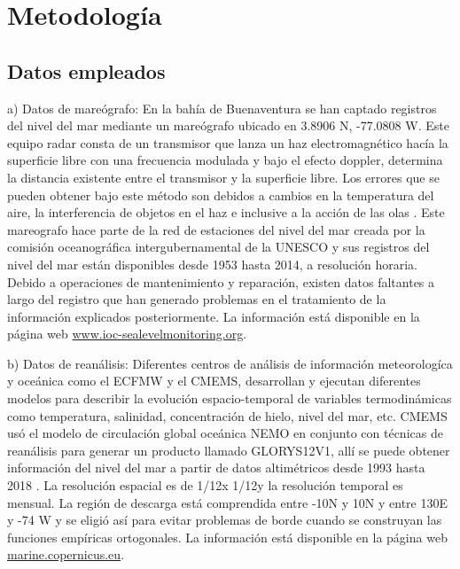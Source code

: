 \chapter{Metodología}

\section{Datos empleados}

a) Datos de mareógrafo: En la bahía de Buenaventura  se han captado registros del nivel del mar mediante un mareógrafo ubicado en 3.8906 \textdegree N, -77.0808 \textdegree W. Este equipo radar consta de un transmisor que lanza un haz electromagnético hacía la superficie libre con una frecuencia modulada y bajo el efecto doppler, determina la distancia existente entre el transmisor y la superficie libre. Los errores que se pueden obtener bajo este método son debidos a cambios en la temperatura del aire, la interferencia de objetos en el haz e inclusive a la acción de las olas \cite{UNESCO2016}. Este mareografo hace parte de la red de estaciones del nivel del mar creada por la comisión oceanográfica intergubernamental de la UNESCO y sus registros del nivel del mar están disponibles desde 1953 hasta 2014, a resolución horaria. Debido a operaciones de mantenimiento y reparación, existen datos faltantes a largo del registro que han generado problemas en el tratamiento de la información explicados posteriormente. La información está disponible en la página web \url{www.ioc-sealevelmonitoring.org}.

b) Datos de reanálisis: Diferentes centros de análisis de información meteorologíca y oceánica como el ECFMW y el CMEMS, desarrollan y ejecutan diferentes modelos para describir la evolución espacio-temporal de variables termodinámicas como temperatura, salinidad, concentración de hielo, nivel del mar, etc. CMEMS usó el modelo de circulación global oceánica NEMO en conjunto con técnicas de reanálisis para generar un producto llamado GLORYS12V1, allí se puede obtener información del nivel del mar a partir de datos altimétricos desde 1993 hasta 2018 \cite{Fernandez2018}. La resolución espacial es de 1/12\textdegree x 1/12\textdegree y la resolución temporal es mensual. La región de descarga está comprendida entre -10\textdegree N y 10\textdegree N y entre 130\textdegree E y -74\textdegree
W y se eligió así para evitar problemas de borde cuando se construyan las funciones empíricas ortogonales. La información está disponible en la página web \url{marine.copernicus.eu}.

